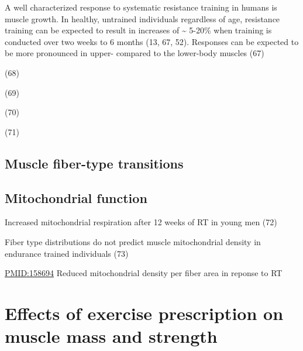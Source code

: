 \documentclass[twoside,10pt]{gihclass} %
\begin{document}
A well characterized response to systematic resistance training in humans is muscle growth. In healthy, untrained individuals regardless of age, resistance training can be expected to result in increases of \textasciitilde{} 5-20\% when training is conducted over two weeks to 6 months
(13, 67, 52).
Responses can be expected to be more pronounced in upper- compared to the lower-body muscles
(67)

(68)

(69)

(70)

(71)

\hypertarget{muscle-fiber-type-transitions}{%
\subsection{Muscle fiber-type transitions}\label{muscle-fiber-type-transitions}}

\hypertarget{mitochondrial-function}{%
\subsection{Mitochondrial function}\label{mitochondrial-function}}

Increased mitochondrial respiration after 12 weeks of RT in young men (72)

Fiber type distributions do not predict muscle mitochondrial density in endurance trained individuals (73)

\url{PMID:158694} Reduced mitochondrial density per fiber area in reponse to RT

\hypertarget{effects-of-exercise-prescription-on-muscle-mass-and-strength}{%
\section{Effects of exercise prescription on muscle mass and strength}\label{effects-of-exercise-prescription-on-muscle-mass-and-strength}}
\end{document}
